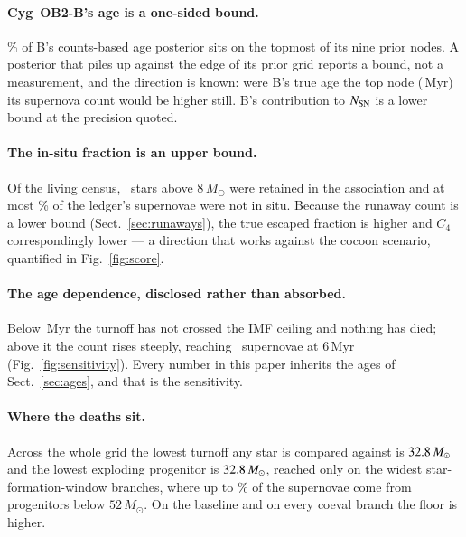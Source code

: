 \documentclass{aa}
\begin{document}
\paragraph{Cyg~OB2-B's age is a one-sided bound.}
\railB\% of B's counts-based age posterior sits on the topmost of its nine prior
nodes. A posterior that piles up against the edge of its prior grid reports a
bound, not a measurement, and the direction is known: were B's true age the top
node (\railtopB\,Myr) its supernova count would be higher still. B's
contribution to $N_{\rm SN}$ is a lower bound at the precision quoted.

\paragraph{The in-situ fraction is an upper bound.}
Of the living census, \livingRetained\ stars above 8\,$M_\odot$ were retained in
the association and at most \runawayFraction\% of the ledger's supernovae were
not in situ. Because the runaway count is a lower bound
(Sect.~\ref{sec:runaways}), the true escaped fraction is higher and $C_4$
correspondingly lower --- a direction that works against the cocoon scenario,
quantified in Fig.~\ref{fig:score}.

\paragraph{The age dependence, disclosed rather than absorbed.}
Below \ageZeroBelow\,Myr the turnoff has not crossed the IMF ceiling and nothing
has died; above it the count rises steeply, reaching \NSNatSix\ supernovae at
6\,Myr (Fig.~\ref{fig:sensitivity}). Every number in this paper inherits the
ages of Sect.~\ref{sec:ages}, and that is the sensitivity.

\paragraph{Where the deaths sit.}
Across the whole grid the lowest turnoff any star is compared against is
$32.8\,M_\odot$ and the lowest exploding progenitor is
$32.8\,M_\odot$, reached only on the widest star-formation-window
branches, where up to \fracBelowFiftyTwo\% of the supernovae come from
progenitors below $52\,M_\odot$. On the baseline and on every coeval branch the
floor is higher.
\end{document}
